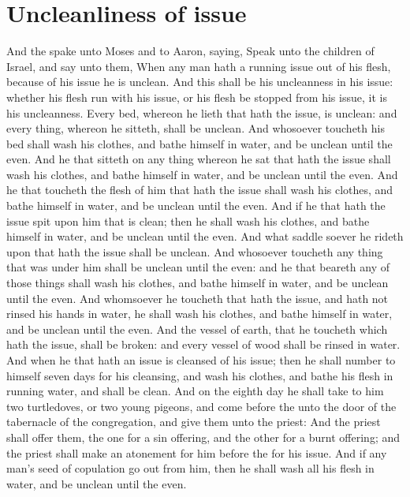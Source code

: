 \section*{Uncleanliness of issue}
\begin{biblechapter} %
\verse And the \LORD spake unto Moses and to Aaron, saying,
\verse Speak unto the children of Israel, and say unto them, When any man hath a running issue out of his flesh, because of his issue he is unclean.
\verse And this shall be his uncleanness in his issue: whether his flesh run with his issue, or his flesh be stopped from his issue, it is his uncleanness.
\verse Every bed, whereon he lieth that hath the issue, is unclean: and every thing, whereon he sitteth, shall be unclean.
\verse And whosoever toucheth his bed shall wash his clothes, and bathe himself in water, and be unclean until the even.
\verse And he that sitteth on any thing whereon he sat that hath the issue shall wash his clothes, and bathe himself in water, and be unclean until the even.
\verse And he that toucheth the flesh of him that hath the issue shall wash his clothes, and bathe himself in water, and be unclean until the even.
\verse And if he that hath the issue spit upon him that is clean; then he shall wash his clothes, and bathe himself in water, and be unclean until the even.
\verse And what saddle soever he rideth upon that hath the issue shall be unclean.
\verse And whosoever toucheth any thing that was under him shall be unclean until the even: and he that beareth any of those things shall wash his clothes, and bathe himself in water, and be unclean until the even.
\verse And whomsoever he toucheth that hath the issue, and hath not rinsed his hands in water, he shall wash his clothes, and bathe himself in water, and be unclean until the even.
\verse And the vessel of earth, that he toucheth which hath the issue, shall be broken: and every vessel of wood shall be rinsed in water.
\verse And when he that hath an issue is cleansed of his issue; then he shall number to himself seven days for his cleansing, and wash his clothes, and bathe his flesh in running water, and shall be clean.
\verse And on the eighth day he shall take to him two turtledoves, or two young pigeons, and come before the \LORD unto the door of the tabernacle of the congregation, and give them unto the priest:
\verse And the priest shall offer them, the one for a sin offering, and the other for a burnt offering; and the priest shall make an atonement for him before the \LORD for his issue.
\verse And if any man's seed of copulation go out from him, then he shall wash all his flesh in water, and be unclean until the even.

\end{biblechapter}
